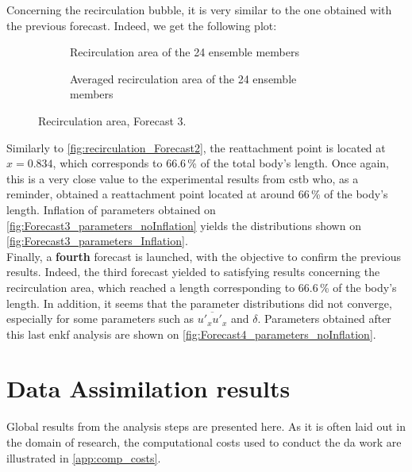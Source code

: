 \documentclass[12pt,twoside]{report}
\begin{document}
Concerning the recirculation bubble, it is very similar to the one obtained with the previous forecast. Indeed, we get the following plot:
\begin{figure}[h!]
  \begin{subfigure}[t]{.48\textwidth}
      \centering
      
      \caption{Recirculation area of the 24 ensemble members}
      \label{fig:recirculation_forecast3_24ensembles}
  \end{subfigure}
\hfill
  \begin{subfigure}[t]{.48\textwidth}
      \centering
      
      \caption{Averaged recirculation area of the 24 ensemble members}
      \label{fig:recirculation_forecast3_24ensemblesAvg}
  \end{subfigure}
  \caption{Recirculation area, Forecast 3.}
  \label{fig:recirculation_Forecast3}
\end{figure}

Similarly to \autoref{fig:recirculation_Forecast2}, the reattachment point is located at $x=0.834$, which corresponds to 66.6\,\% of the total body's length. Once again, this is a very close value to the experimental results from \gls{cstb} who, as a reminder, obtained a reattachment point located at around 66\,\% of the body's length. Inflation of parameters obtained on \autoref{fig:Forecast3_parameters_noInflation} yields the distributions shown on \autoref{fig:Forecast3_parameters_Inflation}. \\

Finally, a \textbf{fourth} forecast is launched, with the objective to confirm the previous results. Indeed, the third forecast yielded to satisfying results concerning the recirculation area, which reached a length corresponding to 66.6\,\% of the body's length. In addition, it seems that the parameter distributions did not converge, especially for some parameters such as $\overline{u'_x u'_x}$ and $\delta$. Parameters obtained after this last \gls{enkf} analysis are shown on \autoref{fig:Forecast4_parameters_noInflation}. 


\clearpage

\section{Data Assimilation results}

Global results from the analysis steps are presented here. As it is often laid out in the domain of research, the computational costs used to conduct the \gls{da} work are illustrated in \autoref{app:comp_costs}. 
\end{document}
